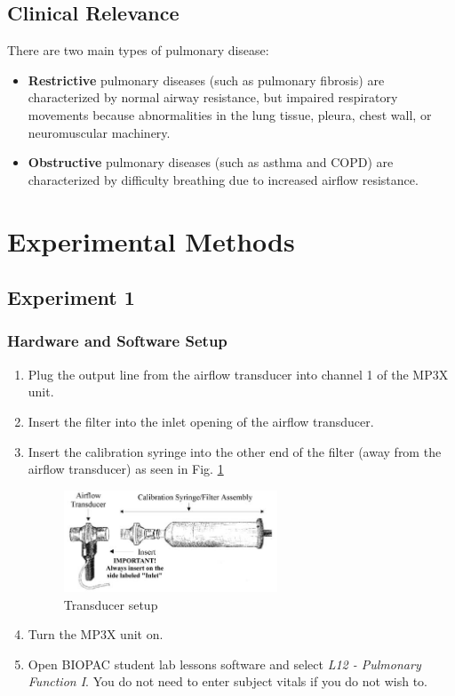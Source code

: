 \documentclass{article}
\begin{document}
\subsection*{Clinical Relevance}
There are two main types of pulmonary disease:
\begin{itemize}
	\item \textbf{Restrictive} pulmonary diseases (such as pulmonary fibrosis) are characterized by normal airway resistance, but impaired respiratory movements because abnormalities in the lung tissue, pleura, chest wall, or neuromuscular machinery.
	\item \textbf{Obstructive} pulmonary diseases (such as asthma and COPD) are characterized by difficulty breathing due to increased airflow resistance.
\end{itemize}

\section*{Experimental Methods}
\subsection*{Experiment 1}
\subsubsection*{Hardware and Software Setup}
\begin{enumerate}
	\item Plug the output line from the airflow transducer into channel 1 of the MP3X unit.
	\item Insert the filter into the inlet opening of the airflow transducer.
	\item Insert the calibration syringe into the other end of the filter (away from the airflow transducer) as seen in Fig. \ref{xdc}
		\begin{figure}[h]
	\centering\includegraphics[width=0.6\textwidth]{../images/PF_I_4.jpg}
		\caption{Transducer setup}
		\label{xdc}
		\end{figure}
		
	\item Turn the MP3X unit on.
	\item Open BIOPAC student lab lessons software and select \textit{L12 - Pulmonary Function I}. You do not need to enter subject vitals if you do not wish to.
\end{enumerate}
\end{document}
